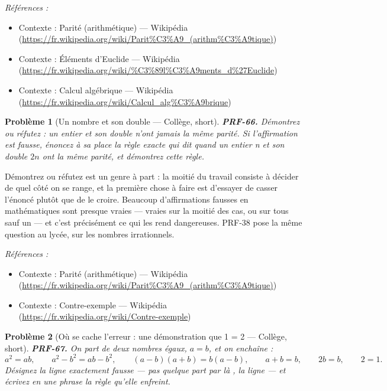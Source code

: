 \documentclass[11pt]{article}
\newtheorem{problem}{Problème}
\newenvironment{refs}{\par\small\noindent\emph{Références :}\begin{itemize}\setlength\itemsep{0pt}}{\end{itemize}\normalsize}
\begin{document}
\begin{refs}
\item Contexte : Parité (arithmétique) --- Wikipédia (\url{https://fr.wikipedia.org/wiki/Parit%C3%A9_(arithm%C3%A9tique)})
\item Contexte : Éléments d'Euclide --- Wikipédia (\url{https://fr.wikipedia.org/wiki/%C3%89l%C3%A9ments_d%27Euclide})
\item Contexte : Calcul algébrique --- Wikipédia (\url{https://fr.wikipedia.org/wiki/Calcul_alg%C3%A9brique})
\end{refs}

\bigskip

\begin{problem}[{Un nombre et son double --- Collège, short}]
\textbf{PRF-66.} Démontrez ou réfutez : un entier et son double n'ont
jamais la même parité. Si l'affirmation est fausse, énoncez à sa place la règle exacte qui
dit quand un entier n et son double $ 2n $ ont la même parité, et démontrez cette
règle.
\end{problem}

\noindent \og{} Démontrez ou réfutez \fg{} est un genre à part : la moitié du travail
consiste à décider de quel côté on se range, et la première chose à faire est d'essayer de
casser l'énoncé plutôt que de le croire. Beaucoup d'affirmations fausses en mathématiques
sont presque vraies --- vraies sur la moitié des cas, ou sur tous sauf un --- et c'est
précisément ce qui les rend dangereuses. PRF-38 pose la même question au lycée, sur les
nombres irrationnels.

\begin{refs}
\item Contexte : Parité (arithmétique) --- Wikipédia (\url{https://fr.wikipedia.org/wiki/Parit%C3%A9_(arithm%C3%A9tique)})
\item Contexte : Contre-exemple --- Wikipédia (\url{https://fr.wikipedia.org/wiki/Contre-exemple})
\end{refs}

\bigskip

\begin{problem}[{Où se cache l'erreur : une \og{} démonstration \fg{} que 1 = 2 --- Collège, short}]
\textbf{PRF-67.} On part de deux nombres égaux, $ a = b $, et on
enchaîne :
\[ a^2 = ab, \qquad a^2 - b^2 = ab - b^2, \qquad (a-b)(a+b) = b(a-b), \qquad a+b = b, \qquad 2b = b, \qquad 2 = 1. \]
Désignez la ligne exactement fausse --- pas \og{} quelque part par là \fg{}, la ligne --- et écrivez en
une phrase la règle qu'elle enfreint.
\end{problem}
\end{document}
